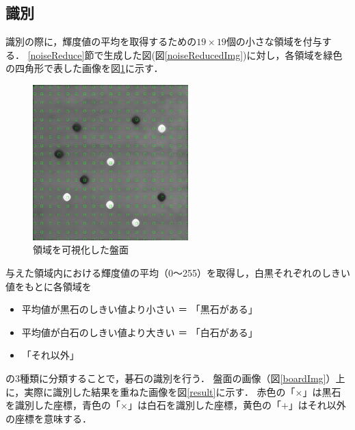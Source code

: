\documentclass[openright]{nitocs}
\numberwithin{equation}{section}
\begin{document}
        \subsection{識別}
            \label{area}
            識別の際に，輝度値の平均を取得するための$19\times19$個の小さな領域を付与する．
            \ref{noiseReduce}節で生成した図(図\ref{noiseReducedImg})に対し，各領域を緑色の四角形で表した画像を図\ref{boardWithArea}に示す．
            \begin{figure}[tb] %
                \begin{center}
                \includegraphics[clip,width=60mm]{DSC_0041/boardWithAreaImg.jpg} 
                \caption{領域を可視化した盤面}
                \label{boardWithArea}
                \end{center}
            \end{figure}

            与えた領域内における輝度値の平均（0～255）を取得し，白黒それぞれのしきい値をもとに各領域を
            \begin{itemize} %
                \item 平均値が黒石のしきい値より小さい ＝ 「黒石がある」
                \item 平均値が白石のしきい値より大きい ＝ 「白石がある」
                \item 「それ以外」
            \end{itemize}
            の3種類に分類することで，碁石の識別を行う．
            盤面の画像（図\ref{boardImg}）上に，実際に識別した結果を重ねた画像を図\ref{result}に示す．
            赤色の「$\times$」は黒石を識別した座標，青色の「$\times$」は白石を識別した座標，黄色の「$+$」はそれ以外の座標を意味する．
\end{document}
